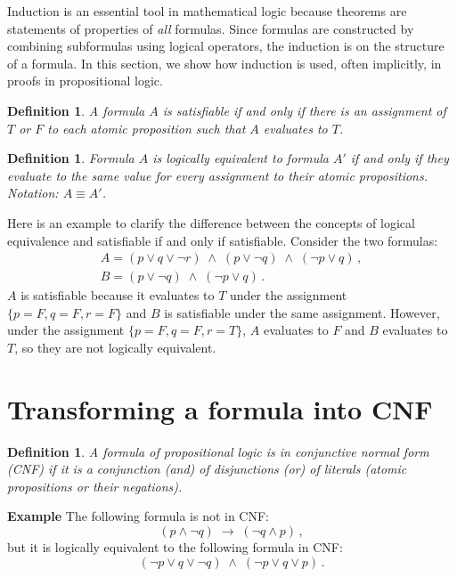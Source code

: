 \documentclass[11pt,a4paper]{report}
\newtheorem{definition}[theorem]{Definition}
\begin{document}
Induction is an essential tool in mathematical logic because theorems are statements of properties of \emph{all} formulas. Since formulas are constructed by combining subformulas using logical operators, the induction is on the structure of a formula. In this section, we show how induction is used, often implicitly, in proofs in propositional logic.

\begin{definition}
A formula $A$ is \emph{satisfiable} if and only if there is an assignment of $T$ or $F$ to each atomic proposition such that $A$ evaluates to $T$.
\end{definition}

\begin{definition}
Formula $A$ is \emph{logically equivalent} to formula $A'$ if and only if they evaluate to the same value for every assignment to their atomic propositions. Notation: $A\equiv A'$.
\end{definition}

Here is an example to clarify the difference between the concepts of logical equivalence and satisfiable if and only if satisfiable. Consider the two formulas:
\[
\begin{array}{l}
A=(p \vee q \vee \neg r) \;\wedge\; (p \vee \neg q) \;\wedge\; (\neg p \vee q)\,,\\
B=(p \vee \neg q) \;\wedge\; (\neg p \vee q)\,.
\end{array}
\]
$A$ is satisfiable because it evaluates to $T$ under the assignment $\{p=F,q=F,r=F\}$ and $B$ is satisfiable under the same assignment. However, under the assignment $\{p=F,q=F,r=T\}$, $A$ evaluates to $F$ and $B$ evaluates to $T$, so they are not logically equivalent.

\section{Transforming a formula into CNF}

\begin{definition}
A formula of propositional logic is in \emph{conjunctive normal form (CNF)} if it is a conjunction (and) of disjunctions (or) of literals (atomic propositions or their negations).
\end{definition}

\vspace*{-10pt}
\textbf{Example} The following formula is not in CNF:
\begin{equation}\label{eq.logic}
(p \wedge \neg q) \;\rightarrow\; (\neg q \wedge p)\,,
\end{equation}
but it is logically equivalent to the following formula in CNF:
\begin{equation}\label{eq.cnf3}
(\neg p \vee q \vee \neg q) \;\wedge\; (\neg p \vee q \vee p)\,.
\end{equation}
\end{document}
